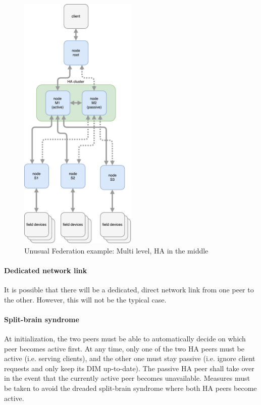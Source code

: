 \begin{figure}[]
	\center
	\includegraphics[width=0.5\textwidth]{img/ml_ha_on_mid_exotic_topology.pdf}
	\caption{Unusual Federation example: Multi level, \gls{HA} in the middle}
	\label{fig:topo:exotic:ml:ha:on:mid}
\end{figure}


\paragraph{Dedicated network link}
It is possible that there will be a dedicated, direct network link from one peer to
the other. However, this will not be the typical case.

\paragraph{Split-brain syndrome}
At initialization, the two peers must be able to automatically decide on which peer
becomes active first.  At any time, only one of the two HA peers must be
active (i.e. serving clients), and the other one must stay passive (i.e. ignore
client requests and only keep its DIM up-to-date). The passive HA peer shall
take over in the event that the currently active peer becomes unavailable.
Measures must be taken to avoid the dreaded split-brain syndrome where both HA
peers become active.

